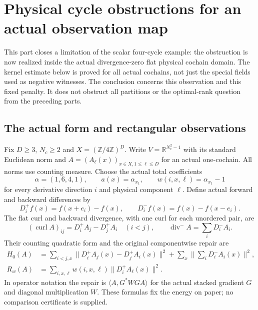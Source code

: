 \section{Physical cycle obstructions for an actual observation map}
\label{sec:physical-cycle}
This part closes a limitation of the scalar four-cycle example: the
obstruction is now realized inside the actual divergence-zero flat physical
cochain domain. The kernel estimate below is proved for all actual cochains,
not just the special fields used as negative witnesses. The conclusion
concerns this observation and this fixed penalty. It does not obstruct all
partitions or the optimal-rank question from the preceding parts.

\subsection{The actual form and rectangular observations}
Fix $D\geq3$, $N_c\geq2$ and $X=(\mathbb Z/4\mathbb Z)^D$.
Write $V=\mathbb R^{N_c^2-1}$ with its standard Euclidean norm and
$A=(A_\ell(x))_{x\in X,1\leq\ell\leq D}$ for an actual one-cochain.
All norms use counting measure. Choose the actual total coefficients
\[
 \alpha=(1,6,4,1),\qquad a(x)=\alpha_{x_1},\qquad
 w(i,x,\ell)=\alpha_{x_1}-1
\]
for every derivative direction $i$ and physical component $\ell$.
Define actual forward and backward differences by
\[
 D_i^+f(x)=f(x+e_i)-f(x),\qquad D_i^-f(x)=f(x)-f(x-e_i).
\]
The flat curl and backward divergence, with one curl for each unordered
pair, are
\[
 (\operatorname{curl}A)_{ij}=D_i^+A_j-D_j^+A_i\quad(i<j),\qquad
 \operatorname{div}^-A=\sum_iD_i^-A_i.
\]
Their counting quadratic form and the original componentwise repair are
\begin{align*}
 H_0(A)&=\sum_{i<j,x}\|D_i^+A_j(x)-D_j^+A_i(x)\|^2
       +\sum_x\Big\|\sum_iD_i^-A_i(x)\Big\|^2,\\
 R_w(A)&=\sum_{i,x,\ell}w(i,x,\ell)\|D_i^+A_\ell(x)\|^2.
\end{align*}
In operator notation the repair is $\langle A,G^*WG A\rangle$ for the
actual stacked gradient $G$ and diagonal multiplication $W$.
These formulas fix the energy on paper; no comparison certificate is supplied.

